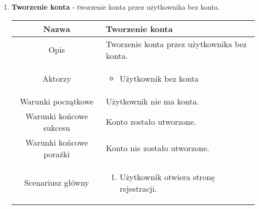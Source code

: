 \documentclass{article}
\begin{document}
\begin{enumerate}
\begin{enumerate}
			\item \textbf{Tworzenie konta} - tworzenie konta przez użytkownika bez
				konta.
				\begin{table}[H]
					\centering
					\begin{tabular}{|c|p{7cm}|}
						\hline
						Nazwa                   & Tworzenie konta                                                                                                                                                                                                                                                          \\
						\hline
						Opis                    & Tworzenie konta przez użytkownika bez konta.                                                                                                                                                                                                                             \\
						\hline
						Aktorzy                 & \begin{itemize}\item Użytkownik bez konta\end{itemize}                                                                                                                                                                                                                   \\
						\hline
						Warunki początkowe      & Użytkownik nie ma konta.                                                                                                                                                                                                                                                 \\
						\hline
						Warunki końcowe sukcesu & Konto zostało utworzone.                                                                                                                                                                                                                                                 \\
						\hline
						Warunki końcowe porażki & Konto nie zostało utworzone.                                                                                                                                                                                                                                             \\
						\hline
						Scenariusz główny       & \begin{enumerate}\item Użytkownik otwiera stronę rejestracji.


\end{enumerate}
\end{tabular}
\end{table}
\end{enumerate}
\end{enumerate}
\end{document}
